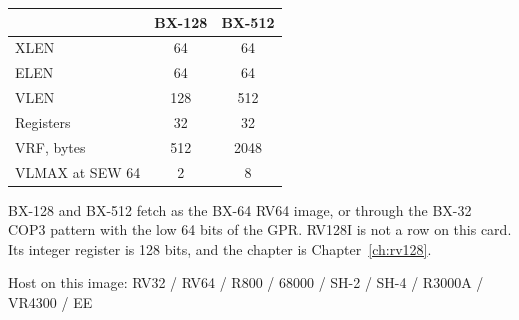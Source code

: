 \begin{center}
\small
\begin{tabular}{@{}lcc@{}}
\toprule
 & BX-128 & BX-512 \\
\midrule
XLEN & 64 & 64 \\
ELEN & 64 & 64 \\
VLEN & 128 & 512 \\
Registers & 32 & 32 \\
VRF, bytes & 512 & 2048 \\
VLMAX at SEW 64 & 2 & 8 \\
\bottomrule
\end{tabular}
\end{center}

\noindent BX-128 and BX-512 fetch as the BX-64 RV64 image, or through the BX-32 COP3 pattern with the low 64 bits of the GPR. RV128I is not a row on this card. Its integer register is 128 bits, and the chapter is Chapter~\ref{ch:rv128}.

\bigskip
\noindent Host on this image: RV32 / RV64 / R800 / 68000 / SH-2 / SH-4 / R3000A / VR4300 / EE
